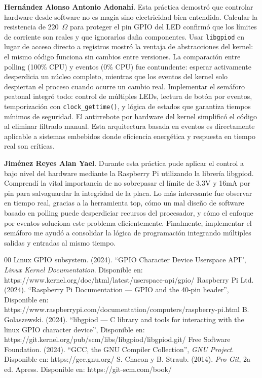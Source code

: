 \documentclass[conference]{IEEEtran}
\begin{document}
\textbf{Hernández Alonso Antonio Adonahí}. Esta práctica demostró que controlar hardware desde software no es magia sino electricidad bien entendida. Calcular la resistencia de 220~$\Omega$ para proteger el pin GPIO del LED confirmó que los límites de corriente son reales y que ignorarlos daña componentes. Usar \texttt{libgpiod} en lugar de acceso directo a registros mostró la ventaja de abstracciones del kernel: el mismo código funciona sin cambios entre versiones. La comparación entre polling (100\% CPU) y eventos (0\% CPU) fue contundente: esperar activamente desperdicia un núcleo completo, mientras que los eventos del kernel solo despiertan el proceso cuando ocurre un cambio real. Implementar el semáforo peatonal integró todo: control de múltiples LEDs, lectura de botón por eventos, temporización con \texttt{clock\_gettime()}, y lógica de estados que garantiza tiempos mínimos de seguridad. El antirrebote por hardware del kernel simplificó el código al eliminar filtrado manual. Esta arquitectura basada en eventos es directamente aplicable a sistemas embebidos donde eficiencia energética y respuesta en tiempo real son críticas.

\textbf{Jiménez Reyes Alan Yael}. Durante esta práctica pude aplicar el control a bajo nivel del hardware mediante la Raspberry Pi utilizando la librería libgpiod. Comprendí la vital importancia de no sobrepasar el límite de 3.3V y 16mA por pin para salvaguardar la integridad de la placa. Lo más interesante fue observar en tiempo real, gracias a la herramienta top, cómo un mal diseño de software basado en polling puede desperdiciar recursos del procesador, y cómo el enfoque por eventos soluciona este problema eficientemente. Finalmente, implementar el semáforo me ayudó a consolidar la lógica de programación integrando múltiples salidas y entradas al mismo tiempo.

\begin{thebibliography}{00}
	 Linux GPIO subsystem. (2024). ``GPIO Character Device Userspace API'', \textit{Linux Kernel Documentation}. Disponible en: https://www.kernel.org/doc/html/latest/userspace-api/gpio/
	 Raspberry Pi Ltd. (2024). ``Raspberry Pi Documentation --- GPIO and the 40-pin header'', Disponible en: https://www.raspberrypi.com/documentation/computers/raspberry-pi.html
	 B. Golaszewski. (2024). ``libgpiod --- C library and tools for interacting with the linux GPIO character device'', Disponible en: https://git.kernel.org/pub/scm/libs/libgpiod/libgpiod.git/
	 Free Software Foundation. (2024). ``GCC, the GNU Compiler Collection'', \textit{GNU Project}. Disponible en: https://gcc.gnu.org/
	 S. Chacon y B. Straub. (2014). \textit{Pro Git}, 2a ed. Apress. Disponible en: https://git-scm.com/book/
\end{thebibliography}
\end{document}
